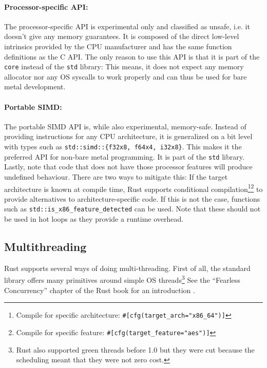 \paragraph{Processor-specific API:} The processor-specific API is experimental only and classified as unsafe, i.e. it doesn't give any memory guarantees. It is composed of the direct low-level intrinsics provided by the CPU manufacturer and has the same function definitions as the C API. The only reason to use this API is that it is part of the \texttt{core} instead of the \texttt{std} library: This means, it does not expect any memory allocator nor any OS syscalls to work properly and can thus be used for bare metal development.

\paragraph{Portable SIMD:} The portable \ac{SIMD} API is, while also experimental, memory-safe. Instead of providing instructions for any CPU architecture, it is generalized on a bit level with types such as \texttt{std::simd::\{f32x8, f64x4, i32x8\}}. This makes it the preferred API for non-bare metal programming. It is part of the \texttt{std} library.\\

Lastly, note that code that does not have those processor features will produce undefined behaviour. There are two ways to mitigate this: If the target architecture is known at compile time, Rust supports conditional compilation\footnote{Compile for specific architecture: \texttt{\#[cfg(target\_arch="x86\_64")]}}\footnote{Compile for specific feature: \texttt{\#[cfg(target\_feature="aes")]}} to provide alternatives to architecture-specific code. If this is not the case, functions such as \texttt{std::is\_x86\_feature\_detected} can be used. Note that these should not be used in hot loops as they provide a runtime overhead.

\subsection{Multithreading}

Rust supports several ways of doing multi-threading. First of all, the standard library offers many primitives around simple OS threads\footnote{Rust also supported green threads before 1.0 but they were cut because the scheduling meant that they were not zero cost.} See the ``Fearless Concurrency'' chapter of the Rust book for an introduction \cite{conbook}.\\


